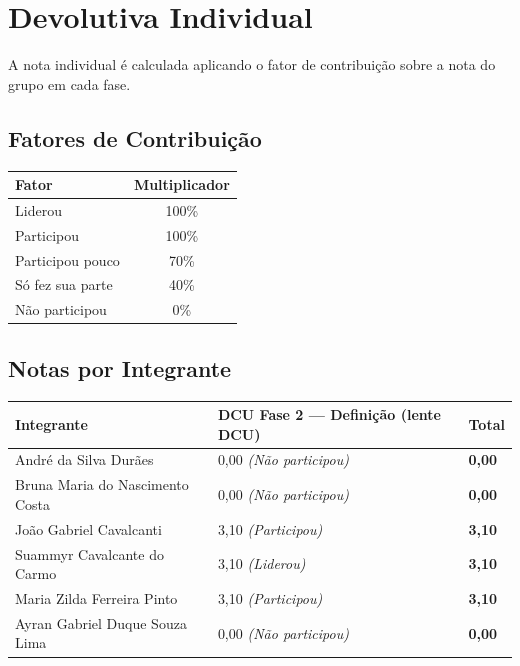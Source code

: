 \documentclass[
  sigconf,
  nonacm, %
  language=portuguese
]{acmart}
\begin{document}
\section{Devolutiva Individual}

A nota individual é calculada aplicando o fator de contribuição sobre a nota do grupo em cada fase.

\subsection{Fatores de Contribuição}

\begin{tabularx}{0.6\linewidth}{@{} X c @{}}
\toprule
\textbf{Fator} & \textbf{Multiplicador} \\
\midrule
Liderou & 100\% \\
Participou & 100\% \\
Participou pouco & 70\% \\
Só fez sua parte & 40\% \\
Não participou & 0\% \\
\bottomrule
\end{tabularx}

\vspace{1em}
\subsection{Notas por Integrante}

\begin{tabularx}{\linewidth}{@{} X X p{2.5cm} @{}}
\toprule
\textbf{Integrante} & \textbf{\small DCU Fase 2 — Definição (lente DCU)} & \textbf{Total} \\
\midrule
André da Silva Durães & 0,00 \textit{(Não participou)} & \textbf{0,00} \\
Bruna Maria do Nascimento Costa & 0,00 \textit{(Não participou)} & \textbf{0,00} \\
João Gabriel Cavalcanti & 3,10 \textit{(Participou)} & \textbf{3,10} \\
Suammyr Cavalcante do Carmo & 3,10 \textit{(Liderou)} & \textbf{3,10} \\
Maria Zilda Ferreira Pinto & 3,10 \textit{(Participou)} & \textbf{3,10} \\
Ayran Gabriel Duque Souza Lima & 0,00 \textit{(Não participou)} & \textbf{0,00} \\
\bottomrule
\end{tabularx}
\end{document}
